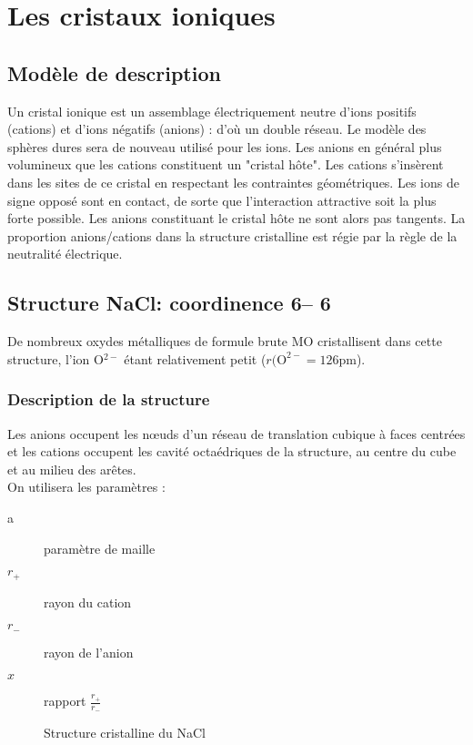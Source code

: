 \chapter{Les cristaux ioniques}
\section{Modèle de description}
Un cristal ionique est un assemblage électriquement neutre d'ions positifs (cations)
et d'ions négatifs (anions) : d'où un double réseau. Le modèle des sphères dures sera
de nouveau utilisé pour les ions.
Les anions en général plus volumineux que les cations constituent un "cristal hôte".
Les cations s’insèrent dans les sites de ce cristal en respectant les contraintes 
géométriques. Les ions de signe opposé sont en contact, de sorte que l'interaction attractive
soit la plus forte possible. Les anions constituant le cristal hôte ne sont alors 
pas tangents. La proportion anions/cations dans la structure cristalline est régie 
par la règle de la neutralité électrique.

\section{Structure NaCl: coordinence 6\--- 6}
De nombreux oxydes métalliques de formule brute MO cristallisent dans cette
structure, l'ion O$^{2-}$ étant relativement petit ($r(\text{O}^{2-} = 126$pm).


\subsection{Description de la structure}
Les anions  occupent les n\oe uds d'un réseau de translation cubique à faces
centrées et les cations occupent les cavité octaédriques  de la structure,
au centre du cube et au milieu des arêtes.\\
On utilisera les paramètres :
\begin{description}
    \item[a] paramètre de maille
    \item[$r_+$] rayon du cation
    \item[$r_-$] rayon de l'anion
    \item[$x$] rapport $\frac{r_+}{r_-}$ 
\end{description}
\begin{figure}
    \centering
    \qquad
    \caption{Structure cristalline du NaCl}\label{fig:3_nacl_struct}
\end{figure}


